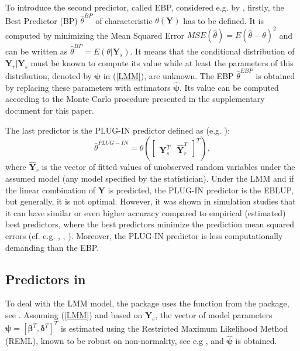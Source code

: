 To introduce the second predictor, called EBP, considered e.g. by \cite{molina2010small}, firstly, the Best Predictor (BP) $\hat{\theta}^{BP}$ of characteristic $\theta(\mathbf{Y})$ has to be defined. It is computed by minimizing the Mean Squared Error $MSE(\hat\theta )=E(\hat\theta - \theta)^2$ and can be written as $\hat\theta^{BP} = E(\theta|\mathbf{Y}_s)$. It means that the conditional distribution of $\mathbf{Y}_r|\mathbf{Y}_s$ must be known to compute its value while at least the parameters of this distribution, denoted by $\boldsymbol{\psi}$ in (\ref{LMM}), are unknown. The EBP $\hat\theta^{EBP}$ is obtained by replacing these parameters with estimators $\hat{\boldsymbol{\psi}}$. Its value can be computed according to the Monte Carlo procedure presented in the supplementary document for this paper.

The last predictor is the PLUG-IN predictor defined as (e.g. \cite{chwila2019properties}):
\begin{equation}
	\hat{\theta}^{PLUG-IN}=\theta(\begin{bmatrix}
		\mathbf{Y}_s^T & \mathbf{\hat{Y}}_r^T
	\end{bmatrix}^T),
\end{equation}
where $\mathbf{\hat{Y}}_r$ is the vector of fitted values of unobserved random variables under the assumed model (any model specified by the statistician). Under the LMM and if the linear combination of $\mathbf{Y}$ is predicted, the PLUG-IN predictor is the EBLUP, but generally, it is not optimal. However, it was shown in simulation studies that it can have similar or even higher accuracy compared to empirical (estimated) best predictors, where the best predictors minimize the prediction mean squared errors (cf. e.g. \cite{boubeta2016empirical}, \cite{chwila2019properties}, \cite{hobza2016empirical}). Moreover, the PLUG-IN predictor is less computationally demanding than the EBP.

\subsection{Predictors in }

To deal with the LMM model, the  package  uses the  function from the  package, see \cite{lme4}. Assuming (\ref{LMM}) and based on $\mathbf{Y}_s$, the vector of model parameters $\boldsymbol{\psi} = [\boldsymbol{\beta}^T, \pmb{\delta}^T]^T$ is estimated using the Restricted Maximum Likelihood Method (REML), known to be robust on non-normality, see e.g \cite{jiang1996reml}, and $\hat{\boldsymbol{\psi}}$ is obtained.

